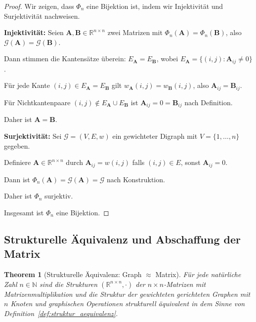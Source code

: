 \documentclass[12pt, a4paper]{article}
\newtheorem{theorem}{Theorem}[section]
\theoremstyle{definition}
\theoremstyle{remark}
\newcommand{\R}{\mathbb{R}}
\newcommand{\N}{\mathbb{N}}
\newcommand{\vA}{\bm{A}}
\newcommand{\vB}{\bm{B}}
\newcommand{\Graph}{\mathcal{G}}
\begin{document}
\begin{proof}
Wir zeigen, dass $\Phi_n$ eine Bijektion ist, indem wir Injektivität und Surjektivität nachweisen.

\textbf{Injektivität:} Seien $\vA, \vB \in \R^{n \times n}$ zwei Matrizen mit $\Phi_n(\vA) = \Phi_n(\vB)$, also $\Graph(\vA) = \Graph(\vB)$.

Dann stimmen die Kantensätze überein: $E_{\vA} = E_{\vB}$, wobei $E_{\vA} = \{(i,j) : \vA_{ij} \neq 0\}$.

Für jede Kante $(i, j) \in E_{\vA} = E_{\vB}$ gilt $w_{\vA}(i,j) = w_{\vB}(i,j)$, also $\vA_{ij} = \vB_{ij}$.

Für Nichtkantenpaare $(i,j) \notin E_{\vA} \cup E_{\vB}$ ist $\vA_{ij} = 0 = \vB_{ij}$ nach Definition.

Daher ist $\vA = \vB$.

\textbf{Surjektivität:} Sei $\Graph = (V, E, w)$ ein gewichteter Digraph mit $V = \{1, \ldots, n\}$ gegeben.

Definiere $\vA \in \R^{n \times n}$ durch $\vA_{ij} = w(i,j)$ falls $(i,j) \in E$, sonst $\vA_{ij} = 0$.

Dann ist $\Phi_n(\vA) = \Graph(\vA) = \Graph$ nach Konstruktion.

Daher ist $\Phi_n$ surjektiv.

Insgesamt ist $\Phi_n$ eine Bijektion.
\end{proof}

\subsection{Strukturelle Äquivalenz und Abschaffung der Matrix}
\label{subsec:strukturelle_aequivalenz}

\begin{theorem}[Strukturelle Äquivalenz: Graph $\approx$ Matrix]
\label{thm:strukturelle_aequivalenz}
Für jede natürliche Zahl $n \in \N$ sind die Strukturen $(\R^{n \times n}, \cdot)$ der $n \times n$-Matrizen mit Matrizenmultiplikation und die Struktur der gewichteten gerichteten Graphen mit $n$ Knoten und graphischen Operationen strukturell äquivalent in dem Sinne von Definition~\ref{def:struktur_aequivalenz}.
\end{theorem}
\end{document}
